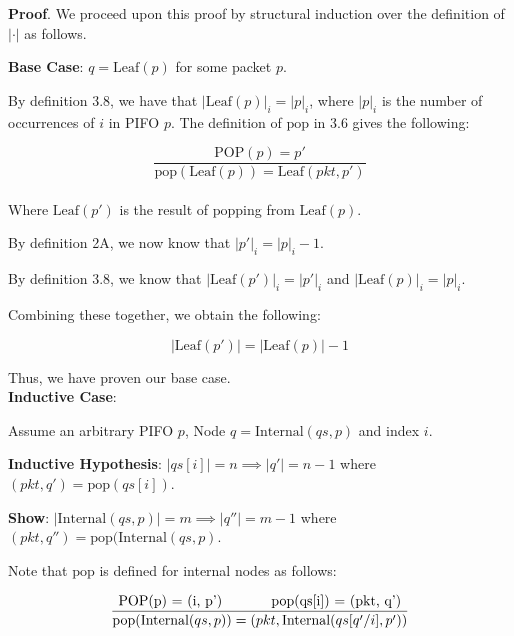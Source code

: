 \documentclass{article}
\begin{document}
\textbf{Proof}. We proceed upon this proof by structural induction over the definition of $|\cdot|$ as follows.\newline

\textbf{Base Case}: $q = \text{Leaf}(p)$ for some packet $p$.\newline

By definition 3.8, we have that $|\text{Leaf}(p)|_i = |p|_i$, where $|p|_i$ is the number of occurrences of $i$ in PIFO $p$. The definition of $\text{pop}$ in 3.6 gives the following:

$$\frac{\text{POP}(p) = p'}{\text{pop}(\text{Leaf}(p)) = \text{Leaf}(pkt, p')}$$\\[-10pt]

Where $\text{Leaf}(p')$ is the result of $\text{pop}$ping from $\text{Leaf}(p)$.\newline

By definition 2A, we now know that $|p'|_i = |p|_i - 1$.\newline

By definition 3.8, we know that $|\text{Leaf}(p')|_i = |p'|_i$ and $|\text{Leaf}(p)|_i = |p|_i$.\newline

Combining these together, we obtain the following:

$$|\text{Leaf}(p')| = |\text{Leaf}(p)| - 1$$

Thus, we have proven our base case.\\[10pt]

\textbf{Inductive Case}:\newline

Assume an arbitrary PIFO $p$, Node $q = \text{Internal}(qs, p)$ and index $i$.\newline

\textbf{Inductive Hypothesis}: $|qs[i]| = n \implies |q'| = n-1$ where $(pkt, q') = \text{pop}(qs[i])$.\newline

\textbf{Show}: $|\text{Internal}(qs, p)| = m \implies |q''| = m-1$ where $(pkt, q'') =\text{pop}(\text{Internal}(qs, p)$.\newline

Note that $\text{pop}$ is defined for internal nodes as follows:

$$\frac{\text{POP(p) = (i, p') \hspace{1cm} \text{pop}(qs[i]) = (pkt, q')}}{{\text{pop}(\text{Internal}(qs, p)) = (pkt, \text{Internal}(qs[q'/i], p'))}}$$\\[-10pt]
\end{document}
